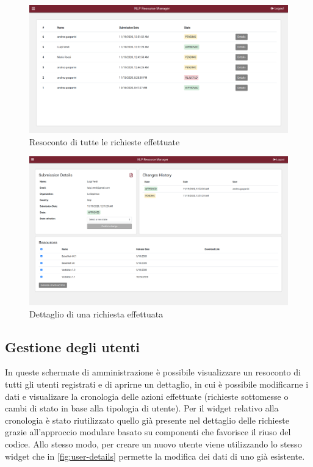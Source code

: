 \begin{figure}[H]
	\centering
	\includegraphics[width=\textwidth]{assets/ui/submissions-list.png}
	\caption{Resoconto di tutte le richieste effettuate}
	\label{fig:submissions-list}
\end{figure}

\begin{figure}[H]
	\centering
	\includegraphics[width=\textwidth]{assets/ui/submission-details.png}
	\caption{Dettaglio di una richiesta effettuata}
	\label{fig:submission-details}
\end{figure}


\subsection{Gestione degli utenti}
In queste schermate di amministrazione è possibile visualizzare un resoconto di
tutti gli utenti registrati e di aprirne un dettaglio, in cui è possibile modificarne
i dati e visualizare la cronologia delle azioni effettuate (richieste sottomesse
o cambi di stato in base alla tipologia di utente). Per il widget relativo alla
cronologia è stato riutilizzato quello già presente nel dettaglio delle richieste
grazie all'approccio modulare basato su componenti che favorisce il riuso del codice.
Allo stesso modo, per creare un nuovo utente viene utilizzando lo stesso widget
che in \autoref{fig:user-details} permette la modifica dei dati di uno già esistente.


